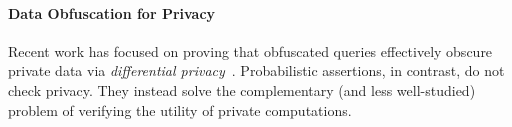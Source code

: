 

\paragraph{Data Obfuscation for Privacy}
Recent work has focused on proving that obfuscated queries effectively
obscure private data via \emph{differential privacy}~\cite{pinq,
airavat, gupt, fuzz, certipriv}. Probabilistic assertions, in contrast, do not check
privacy. They instead solve the complementary (and less well-studied) problem
of verifying the utility of private computations.





